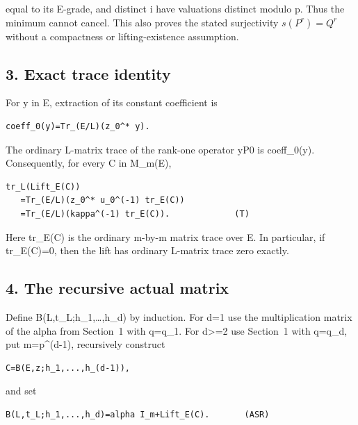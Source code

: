 equal to its E-grade, and distinct i have valuations distinct modulo p.
Thus the minimum cannot cancel. This also proves the stated surjectivity
\(s(P^r)=Q^r\) without a compactness or lifting-existence
assumption.

\hypertarget{odd_tower-exact-trace-identity}{%
\subsection{3. Exact trace identity}\label{odd_tower-exact-trace-identity}}

For y in E, extraction of its constant coefficient is

\begin{Verbatim}[fontsize=\small,breaklines=true,breakanywhere=true]
coeff_0(y)=Tr_(E/L)(z_0^* y).
\end{Verbatim}

The ordinary L-matrix trace of the rank-one operator yP0 is coeff\_0(y).
Consequently, for every C in M\_m(E),

\begin{Verbatim}[fontsize=\small,breaklines=true,breakanywhere=true]
tr_L(Lift_E(C))
   =Tr_(E/L)(z_0^* u_0^(-1) tr_E(C))
   =Tr_(E/L)(kappa^(-1) tr_E(C)).             (T)
\end{Verbatim}

Here tr\_E(C) is the ordinary m-by-m matrix trace over E. In particular,
if tr\_E(C)=0, then the lift has ordinary L-matrix trace zero exactly.

\hypertarget{odd_tower-the-recursive-actual-matrix}{%
\subsection{4. The recursive actual
matrix}\label{odd_tower-the-recursive-actual-matrix}}

Define B(L,t\_L;h\_1,\ldots,h\_d) by induction. For d=1 use the
multiplication matrix of the alpha from Section~1 with q=q\_1. For
d\textgreater=2 use Section~1 with q=q\_d, put m=p\^{}(d-1), recursively
construct

\begin{Verbatim}[fontsize=\small,breaklines=true,breakanywhere=true]
C=B(E,z;h_1,...,h_(d-1)),
\end{Verbatim}

and set

\begin{Verbatim}[fontsize=\small,breaklines=true,breakanywhere=true]
B(L,t_L;h_1,...,h_d)=alpha I_m+Lift_E(C).       (ASR)
\end{Verbatim}

